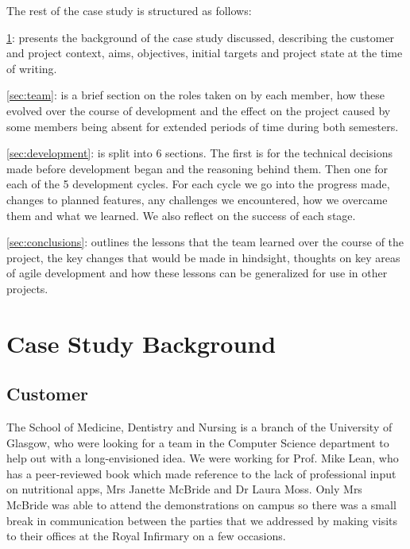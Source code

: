 \documentclass{l3proj}
\begin{document}
\noindent The rest of the case study is structured as follows:

\noindent \ref{sec:background}:  presents the background of the case study discussed, describing the customer and project context, aims, objectives, initial targets and project state at the time of writing. 

\noindent \ref{sec:team}:  is a brief section on the roles taken on by each member, how these evolved over the course of development and the effect on the project caused by some members being absent for extended periods of time during both semesters.

\noindent \ref{sec:development}:  is split into 6 sections. The first is for the technical decisions made before development began and the reasoning behind them. Then one for each of the 5 development cycles. For each cycle we go into the progress made, changes to planned features, any challenges we encountered, how we overcame them and what we learned. We also reflect on the success of each stage.

\noindent \ref{sec:conclusions}:  outlines the lessons that the team learned over the course of the project, the key changes that would be made in hindsight, thoughts on key areas of agile development and how these lessons can be generalized for use in other projects.



\section{Case Study Background}
\label{sec:background}

\subsection{Customer}
The School of Medicine, Dentistry and Nursing is a branch of the University of Glasgow, who were looking for a team in the Computer Science department to help out with a long-envisioned idea. We were working for Prof. Mike Lean, who has a  peer-reviewed book \cite{lean} which made reference to the lack of professional input on nutritional apps, Mrs Janette McBride and Dr Laura Moss. Only Mrs McBride was able to attend the demonstrations on campus so there was a small break in communication between the parties that we addressed by making visits to their offices at the Royal Infirmary on a few occasions.
\end{document}

